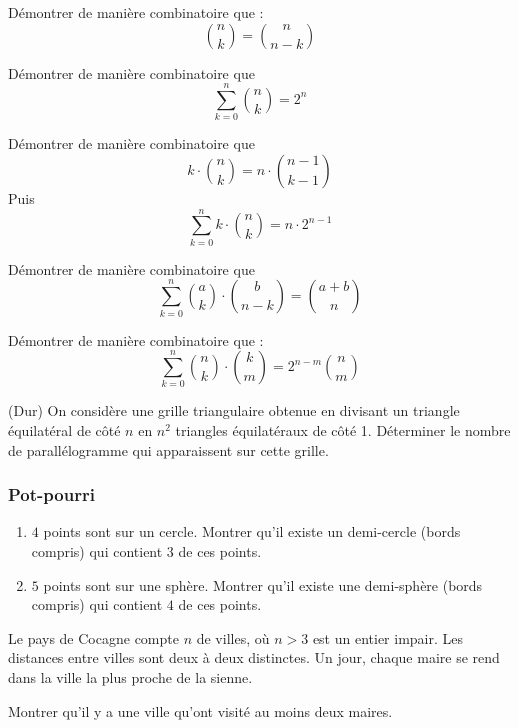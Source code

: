 \begin{exo}
Démontrer de manière combinatoire que :
$$\binom{n}{k}=\binom{n}{n-k}$$
\end{exo}


\begin{exo}
Démontrer de manière combinatoire que
$$ \sum_{k = 0}^{n}{\binom{n}{k}} = 2^n $$
\end{exo}


\begin{exo}
Démontrer de manière combinatoire que
$$k \cdot \binom{n}{k} = n \cdot \binom{n-1}{k-1}$$
Puis
$$\sum_{k = 0}^{n}{k \cdot \binom{n}{k}} = n \cdot 2^{n-1}$$
\end{exo}


\begin{exo}
Démontrer de manière combinatoire que
$$\sum_{k = 0}^{n}{\binom{a}{k} \cdot \binom{b}{n-k}} = \binom{a+b}{n}$$
\end{exo}


\begin{exo}
Démontrer de manière combinatoire que :
$$\sum_{k = 0}^{n}{\binom{n}{k} \cdot \binom{k}{m}} = 2^{n-m}{\binom{n}{m}}$$
\end{exo}


\begin{exo}
(Dur) On considère une grille triangulaire obtenue en divisant un triangle équilatéral de côté $n$ en $n^2$ triangles équilatéraux de côté 1. Déterminer le nombre de parallélogramme qui apparaissent sur cette grille.
\end{exo}


\subsubsection{Pot-pourri}

\begin{exo}
\begin{enumerate}
\item $4$ points sont sur un cercle. Montrer qu’il existe un demi-cercle (bords compris) qui contient $3$ de ces points.
\item $5$ points sont sur une sphère. Montrer qu’il existe une demi-sphère (bords compris) qui contient $4$ de ces points.
\end{enumerate}
\end{exo}

\begin{exo}
Le pays de Cocagne compte $n$ de villes, où $n > 3$ est un entier impair. Les distances entre villes sont deux à deux distinctes. Un jour, chaque maire se rend dans la ville la plus proche de la sienne.

Montrer qu’il y a une ville qu’ont visité au moins deux maires.
\end{exo}

